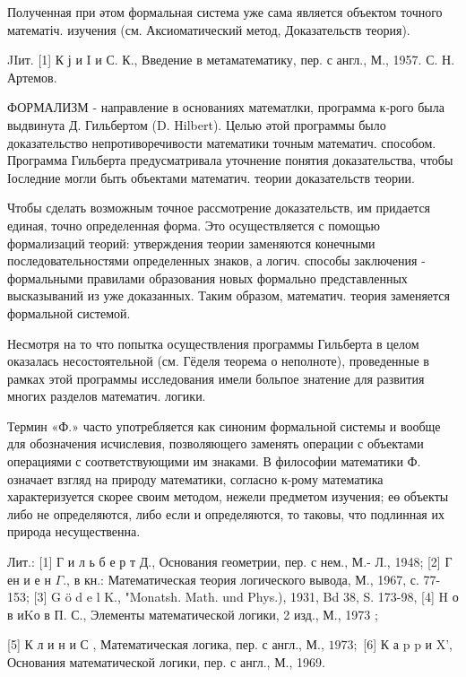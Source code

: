 \documentclass[10pt]{article}
\begin{document}
Полученная при әтом формальная система уже сама является объектом точного математіч. изучения (см. Аксиоматический метод, Доказательств теория).



JIит. [1] К ј и I и С. К., Введение в метаматематику, пер. с англ., М., 1957. С. Н. Артемов.



ФОРМАЛИЗМ - направление в основаниях математлки, программа к-рого была выдвинута Д. Гильбертом (D. Hilbert). Целью әтой программы было доказательство непротиворечивости математики точным математич. способом. Программа Гильберта предусматривала уточнение понятия доказательства, чтобы Іоследние могли быть объектами математич. теории доказательств теории.



Чтобы сделать возможным точное рассмотрение доказательств, им придается единая, точно определенная форма. Это осуществляется с помощью формализаций теорий: утверждения теории заменяются конечными последовательностями определенных знаков, а логич. способы заключения - формальными правилами образования новых формально представленных высказываний из уже доказанных. Таким образом, математич. теория заменяется формальной системой.



Несмотря на то что попытка осуществления программы Гильберта в целом оказалась несостоятельной (см. Гёделя теорема о неполноте), проведенные в рамках этой программы исследования имели больпое знатение для развития многих разделов математич. логики.



Термин «Ф.» часто употребляется как синоним формальной системы и вообще для обозначения исчислевия, позволяющего заменять операции с объектами операциями с соответствующими им знаками. В философии математики Ф. означает взгляд на природу математики, согласно к-рому математика характеризуется скорее своим методом, нежели предметом изучения; еө объекты либо не определяются, либо если и определяются, то таковы, что подлинная их природа несущественна.



Лит.: [1] Г и л ь б е р т Д., Основания геометрии, пер. с нем., М.- Л., 1948; [2] Г ен и е н $\Gamma .$, в кн.: Математическая теория логического вывода, М., 1967, с. 77-153; [3] G ö d e l K., "Monatsh. Math. und Phys.), 1931, Bd 38, S. 173-98, [4] H о в иKо в П. С., Элементы математической логики, 2 изд., М., 1973 ;

[5] К л и н и С , Математическая логика, пер. с англ., М., $1973 ;$ [6] К а p p и X', Основания математической логики, пер. с англ., М., 1969.
\end{document}
